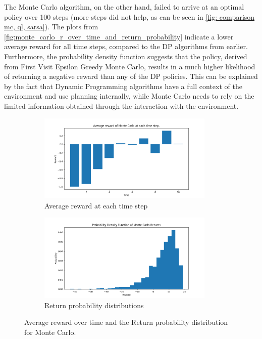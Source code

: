 \documentclass{class}
\begin{document}
\noindent The Monte Carlo algorithm, on the other hand, failed to arrive at an optimal policy over 100 steps (more steps did not help, as can be seen in \autoref{fig: comparison mc, ql, sarsa}). The plots from \autoref{fig:monte_carlo_r_over_time_and_return_probability} indicate a lower average reward for all time steps, compared to the DP algorithms from earlier. Furthermore, the probability density function suggests that the policy, derived from First Visit Epsilon Greedy Monte Carlo, results in a much higher likelihood of returning a negative reward than any of the DP policies. This can be explained by the fact that Dynamic Programming algorithms have a full context of the environment and use planning internally, while Monte Carlo needs to rely on the limited information obtained through the interaction with the environment.

\begin{figure}[H]
    \centering
    \begin{subfigure}[t]{0.47\linewidth}
        \centering
        \includegraphics[height=4.2cm]{../plots/r_over_time/monte_carlo_r_over_time.png}
        \caption{Average reward at each time step}
        \label{fig:monte_carlo_r_over_time}
    \end{subfigure}
    \begin{subfigure}[t]{0.47\linewidth}
        \centering
        \includegraphics[height=4.2cm]{../plots/return_probability/monte_carlo_return_probability.png}
        \caption{Return probability distributions}
        \label{fig:monte_carlo_return_probability}
    \end{subfigure}
    \caption{Average reward over time and the Return probability distribution for Monte Carlo.}
    \label{fig:monte_carlo_r_over_time_and_return_probability}
\end{figure}
\end{document}
